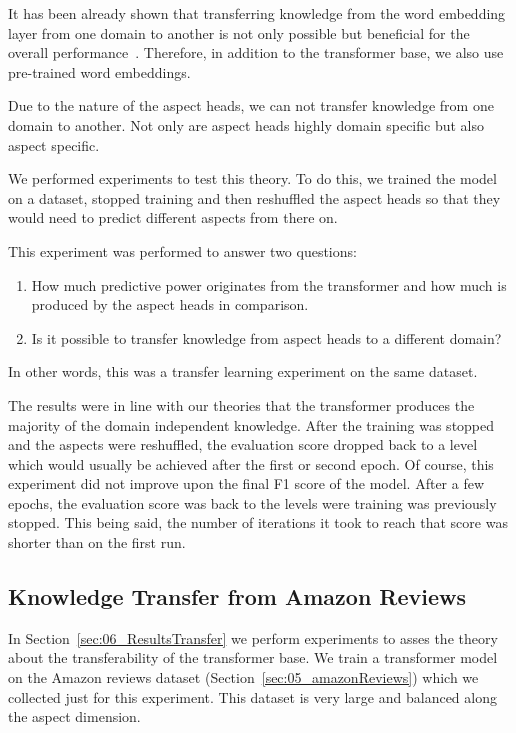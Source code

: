 It has been already shown that transferring knowledge from the word embedding layer from one domain to another is not only possible but beneficial for the overall performance~\cite{Yosinski2014}. Therefore, in addition to the transformer base, we also use pre-trained word embeddings.
\medskip

Due to the nature of the aspect heads, we can not transfer knowledge from one domain to another. Not only are aspect heads highly domain specific but also aspect specific. 
\smallskip

We performed experiments to test this theory. To do this, we trained the model on a dataset, stopped training and then reshuffled the aspect heads so that they would need to predict different aspects from there on. 

This experiment was performed to answer two questions: 

\begin{enumerate}
    \item How much predictive power originates from the transformer and how much is produced by the aspect heads in comparison.
    \item Is it possible to transfer knowledge from aspect heads to a different domain?
\end{enumerate}

In other words, this was a transfer learning experiment on the same dataset.

The results were in line with our theories that the transformer produces the majority of the domain independent knowledge. After the training was stopped and the aspects were reshuffled, the evaluation score dropped back to a level which would usually be achieved after the first or second epoch. Of course, this experiment did not improve upon the final F1 score of the model. After a few epochs, the evaluation score was back to the levels were training was previously stopped. This being said, the number of iterations it took to reach that score was shorter than on the first run.
\medskip

\subsection{Knowledge Transfer from Amazon Reviews}

In Section~\ref{sec:06_ResultsTransfer} we perform experiments to asses the theory about the transferability of the transformer base. We train a transformer model on the Amazon reviews dataset {(Section~\ref{sec:05_amazonReviews})} which we collected just for this experiment. This dataset is very large and balanced along the aspect dimension.
\medskip

